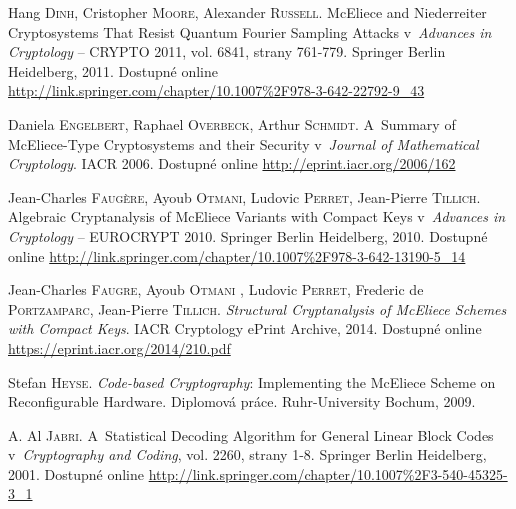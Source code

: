 \documentclass[thesis=M,czech,hidelinks]{FITthesis}[2012/06/26]
\newcommand{\0}{{\textcolor[gray]{0.80}{0}}}
\begin{document}
\begin{thebibliography}{99}
        Hang \textsc{Dinh}, Cristopher \textsc{Moore}, Alexander
        \textsc{Russell}. McEliece and Niederreiter Cryptosystems That Resist
        Quantum Fourier Sampling Attacks v~\emph{Advances in Cryptology} --
        CRYPTO 2011, vol. 6841, strany 761-779. Springer Berlin Heidelberg,
        2011. Dostupné online
        \url{http://link.springer.com/chapter/10.1007\%2F978-3-642-22792-9\_43}

        Daniela \textsc{Engelbert}, Raphael \textsc{Overbeck}, Arthur
        \textsc{Schmidt}. A~Summary of McEliece-Type Cryptosystems and their
        Security v~\emph{Journal of Mathematical Cryptology}. IACR 2006.
        Dostupné online \url{http://eprint.iacr.org/2006/162}

        Jean-Charles \textsc{Faugère}, Ayoub \textsc{Otmani}, Ludovic
        \textsc{Perret}, Jean-Pierre \textsc{Tillich}. Algebraic Cryptanalysis
        of McEliece Variants with Compact Keys v~\emph{Advances in Cryptology}
        -- EUROCRYPT 2010. Springer Berlin Heidelberg, 2010. Dostupné online
        \url{http://link.springer.com/chapter/10.1007\%2F978-3-642-13190-5\_14}

        Jean-Charles \textsc{Faugre}, Ayoub \textsc{Otmani} , Ludovic
        \textsc{Perret}, Frederic de \textsc{Portzamparc}, Jean-Pierre
        \textsc{Tillich}. \emph{Structural Cryptanalysis of McEliece Schemes
        with Compact Keys}. IACR Cryptology ePrint Archive, 2014. Dostupné
        online \url{https://eprint.iacr.org/2014/210.pdf}

%

        Stefan \textsc{Heyse}. \emph{Code-based Cryptography}: Implementing the
        McEliece Scheme on Reconfigurable Hardware. Diplomová práce.
        Ruhr-University Bochum, 2009.

        A. Al \textsc{Jabri}. A~Statistical Decoding Algorithm for General
        Linear Block Codes v~\emph{Cryptography and Coding}, vol. 2260, strany
        1-8. Springer Berlin Heidelberg, 2001. Dostupné online
        \url{http://link.springer.com/chapter/10.1007\%2F3-540-45325-3\_1}


\end{thebibliography}
\end{document}
